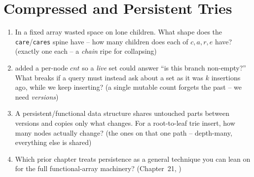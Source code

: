 \section{Compressed and Persistent Tries}\label{sec:c08-variants}

\begin{previouslybox}
\begin{enumerate}[nosep, leftmargin=1.6em]
  \item In  a fixed  array wasted space on lone children. What
        shape does the \texttt{care}/\texttt{cares} spine have -- how many children does each of $c,a,r,e$
        have? (exactly one each -- a \emph{chain} ripe for collapsing)
  \item {} added a per-node $\mathit{cnt}$ so a \emph{live} set could answer ``is this
        branch non-empty?'' What breaks if a query must instead ask about a set as it was $k$ insertions
        ago, while we keep inserting? (a single mutable count forgets the past -- we need \emph{versions})
  \item A persistent/functional data structure shares untouched parts between versions and copies only
        what changes. For a root-to-leaf trie insert, how many nodes actually change? (the ones on that
        one path -- depth-many, everything else is shared)
  \item Which prior chapter treats persistence as a general technique you can lean on for the full
        functional-array machinery? (Chapter~21, )
\end{enumerate}
\end{previouslybox}

